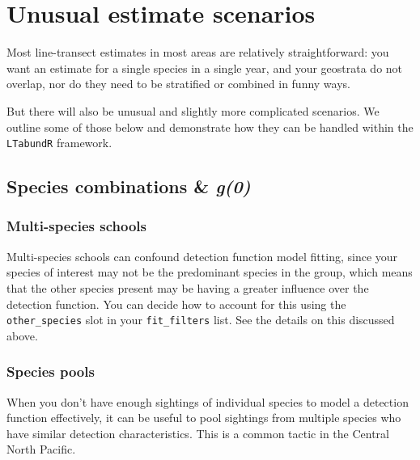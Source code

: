 \documentclass[
]{book}
\begin{document}
\hypertarget{unusual-estimate-scenarios}{%
\section*{Unusual estimate scenarios}\label{unusual-estimate-scenarios}}

Most line-transect estimates in most areas are relatively straightforward: you want an estimate for a single species in a single year, and your geostrata do not overlap, nor do they need to be stratified or combined in funny ways.

But there will also be unusual and slightly more complicated scenarios. We outline some of those below and demonstrate how they can be handled within the \texttt{LTabundR} framework.

\hypertarget{species-combinations-g0}{%
\subsection*{\texorpdfstring{Species combinations \& \emph{g(0)}}{Species combinations \& g(0)}}\label{species-combinations-g0}}

\hypertarget{multi-species-schools}{%
\subsubsection*{Multi-species schools}\label{multi-species-schools}}

Multi-species schools can confound detection function model fitting, since your species of interest may not be the predominant species in the group, which means that the other species present may be having a greater influence over the detection function. You can decide how to account for this using the \texttt{other\_species} slot in your \texttt{fit\_filters} list. See the details on this discussed above.

\hypertarget{species-pools}{%
\subsubsection*{Species pools}\label{species-pools}}

When you don't have enough sightings of individual species to model a detection function effectively, it can be useful to pool sightings from multiple species who have similar detection characteristics. This is a common tactic in the Central North Pacific.
\end{document}
